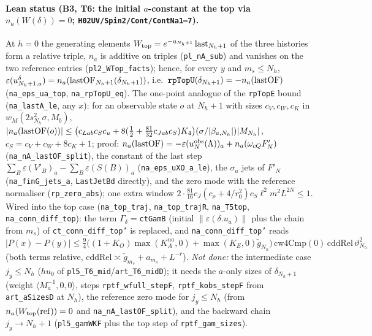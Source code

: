 \documentclass[11pt]{amsart}
\theoremstyle{definition}
\theoremstyle{remark}
\numberwithin{equation}{section}
\begin{document}
\paragraph{Lean status (B3, T6: the initial $a$-constant at the top via $n_a(W(\delta))=0$; \texttt{H02UV/Spin2/Cont/ContNa1--7}).}
At $h=0$ the generating elements $W_{\rm top}=e^{-u_{N_h+1}}\,{\rm last}_{N_h+1}$ of the three histories form a
relative triple, $n_a$ is additive on triples (\texttt{pl\_nA\_sub}) and vanishes on the two reference entries
(\texttt{pl2\_WTop\_facts}); hence, for every $y$ and $m_s\le N_h$,
$\varepsilon(u^\delta_{N_h+1,a})=n_a({\rm lastOF}_{N_h+1}(\delta_{N_h+1}))$, i.e.\
$\texttt{rpTopU}(\delta_{N_h+1})=-n_a({\rm lastOF})$ (\texttt{na\_eps\_ua\_top}, \texttt{na\_rpTopU\_eq}).
The one-point analogue of the \texttt{rpTopE} bound (\texttt{na\_lastA\_le}, any $x$): for an observable state $o$
at $N_h+1$ with sizes $c_V,c_W,c_K$ in $w_M(2s_{N_h}^2\sigma,M_b)$,
$|n_a({\rm lastOF}(o))|\le\bigl(c_{Lab}c_Sc_u+8(\tfrac12+\tfrac{81}{32}c_{Jab}c_S)K_4\bigr)(\sigma/|\beta_{a,N_h}|)|M_{N_h}|$,
$c_S=c_V+c_W+8c_K+1$; proof: $n_a({\rm lastOF})=-\varepsilon(u^{\rm obs}_N(\Lambda))_a+n_a(\omega_{cQ}F'_N)$
(\texttt{na\_nA\_lastOF\_split}), the constant of the last step $\sum_B\varepsilon(V'_B)_a-\sum_B\varepsilon(S(B))_a$
(\texttt{na\_eps\_uXO\_a\_le}), the $\sigma_a$ jets of $F'_N$ (\texttt{na\_finG\_jets\_a}, \texttt{LastJetBd} directly), and
the zero mode with the reference normaliser (\texttt{rp\_zero\_abs}); one extra window
$2\cdot\tfrac{81}{16}c_J(c_\rho+4/r_0^2)c_S\ell^2m^2L^{2N}\le1$. Wired into the top case
(\texttt{na\_top\_traj}, \texttt{na\_top\_trajR}, \texttt{na\_T5top}, \texttt{na\_conn\_diff\_top}): the term
$\Gamma_\delta=$\texttt{ctGamB} (initial $\|\varepsilon(\delta.u_a)\|$ plus the chain from $m_s$) of
\texttt{ct\_conn\_diff\_top'} is replaced, and \texttt{na\_conn\_diff\_top'} reads
$|P(x)-P(y)|\le\tfrac94\bigl((1+K_O)\max(K_A^{na},0)+\max(K_E,0)\check g_{N_h}\bigr)\,\mathrm{cw4Cmp}(0)\,
\mathrm{cddRel}\,\vartheta_{N_h}^2$ (both terms relative, $\mathrm{cddRel}\asymp\check g_{m_s}+a_{m_s}+L^{-r}$).
\emph{Not done:} the intermediate case $j_y\le N_h$ ($hu_0$ of \texttt{pl5\_T6\_mid}/\texttt{art\_T6\_midD}); it needs
the $a$-only sizes of $\delta_{N_h+1}$ (weight $\langle M_a^{-1},0,0\rangle$, steps \texttt{rptf\_wfull\_stepF},
\texttt{rptf\_kobs\_stepF} from \texttt{art\_aSizesD} at $N_h$), the reference zero mode for $j_y\le N_h$ (from
$n_a(W_{\rm top}({\rm ref}))=0$ and \texttt{na\_nA\_lastOF\_split}), and the backward chain $j_y\to N_h+1$
(\texttt{pl5\_gamWKF} plus the top step of \texttt{rptf\_gam\_sizes}).
\end{document}
